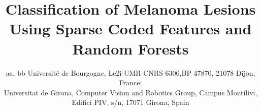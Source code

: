 \title{Classification of Melanoma Lesions Using Sparse Coded Features and Random Forests}
\author{aa, bb
\skiplinehalf
{}Universit\'e de Bourgogne, Le2i-UMR CNRS 6306,BP 47870, 21078 Dijon, France;\\
Universitat de Girona, Computer Vision and Robotics Group, Campus Montilivi, Edifici PIV, s/n, 17071 Girona, Spain} 

